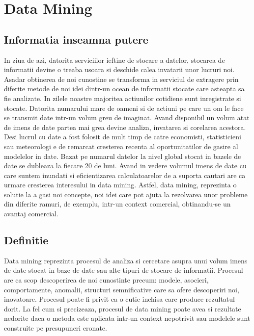 
\chapter{Data Mining} %

\label{Chapter1} %


\section{Informatia inseamna putere}
In ziua de azi, datorita serviciilor ieftine de stocare a datelor, stocarea de informatii devine o treaba usoara si deschide calea invatarii unor lucruri noi. Asadar obtinerea de noi cunostine se transforma in serviciul de extragere prin diferite metode de noi idei  dintr-un ocean de informatii stocate care asteapta sa fie analizate. In zilele noastre majoritea actiunilor cotidiene sunt inregistrate si stocate. Datorita numarului mare de oameni si de actiuni pe care un om le face se transmit date intr-un volum greu de imaginat. Avand disponibil un volum atat de imens de date partea mai grea devine analiza, invatarea si corelarea acestora. Desi lucrul cu date a fost folosit de mult timp de catre economisti, statisticieni sau meteorologi e de remarcat cresterea recenta al oportunitatilor de gasire al modelelor in date. Bazat pe \parencite{DMP2011} numarul datelor la nivel global stocat in bazele de date se dubleaza la fiecare 20 de luni. Avand in vedere volumul imens de date cu care suntem inundati si eficientizarea calculatoarelor de a suporta cautari are ca urmare cresterea interesului in data mining. Astfel, data mining, reprezinta o solutie la a gasi noi concepte, noi idei care pot ajuta la rezolvarea unor probleme din diferite ramuri, de exemplu, intr-un context comercial, obtinandu-se un avantaj comercial. 

\section{Definitie}
Data mining reprezinta procesul de analiza si cercetare asupra unui volum imens de date stocat in baze de date sau alte tipuri de stocare de informatii. Procesul are ca scop descoperirea de noi cunostinte precum: modele, asocieri, comportamente, anomalii, structuri semnificative care sa ofere descoperiri noi, inovatoare. Procesul poate fi privit ca o cutie inchisa care produce rezultatul dorit. La fel cum si \parencite{Disco} precizeaza, procesul de data mining poate avea si rezultate nedorite daca o metoda este aplicata intr-un context nepotrivit sau modelele sunt construite pe presupuneri eronate.   

